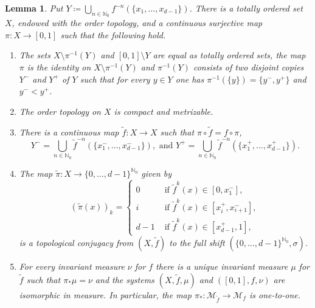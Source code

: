 \documentclass[10pt,a4paper]{amsart}
\numberwithin{equation}{section} %
\numberwithin{figure}{section} %
\newtheorem{lemm}[prop]{Lemma}
\newcommand{\N}{\mathbb{N}}
\renewcommand{\=}{\coloneqq}
\begin{document}
\begin{lemm}\label{extension lemma}
     Put $Y\= \bigcup_{n\in\N_0} f^{-n}(\{x_1,\ldots,x_{d-1}\})$. There is a totally ordered set $X$, endowed with the order topology, and a continuous surjective map $\pi: X\to[0,1]$ such that the following hold.
    \begin{enumerate}
        \item[1.] The sets $X\setminus \pi^{-1}(Y)$ and $[0,1]\setminus Y$ are equal as totally ordered sets, the map $\pi$ is the identity on $X\setminus \pi^{-1}(Y)$ and $\pi^{-1}(Y)$ consists of two disjoint copies $Y^{-}$ and $Y^{+}$ of $Y$ such that for every $y\in Y$ one has $\pi^{-1}(\{y\})=\{y^-,y^+\}$ and $y^-<y^+$.

        \item[2.] The order topology on $X$ is compact and metrizable.

        \item[3.] There is a continuous map $\widetilde{f}: X\to X$ such that $\pi\circ \widetilde{f} = f\circ\pi$,
        \begin{equation*}
            Y^- = \bigcup_{n\in\N_0}\widetilde{f}^{-n}(\{x_1^-,\ldots, x_{d-1}^-\}), \text{ and } Y^+= \bigcup_{n\in\N_0}\widetilde{f}^{-n}(\{x_1^+,\ldots, x_{d-1}^+\}).
        \end{equation*}

    \item[4.] The map $\widetilde{\pi}:X\to \{0,\ldots,d-1\}^{\N_0}$ given by 
\begin{equation*}
    (\widetilde{\pi}(x))_k= \begin{cases}
        0 & \text{ if }\widetilde{f}^k(x) \in [0,x_1^-],\\
        i & \text{ if }\widetilde{f}^k(x) \in [x_i^+,x_{i+1}^-],\\
        d-1 & \text{ if }\widetilde{f}^k(x)\in [x_{d-1}^+,1],
    \end{cases}
\end{equation*}
   is a topological conjugacy from $(X,\widetilde{f})$ to the full shift $(\{0,\ldots,d-1\}^{\N_0},\sigma)$.

    \item[5.] For every invariant measure $\nu$ for $f$ there is a unique invariant measure $\mu$ for $\widetilde{{f}}$ such that $\pi_*\mu=\nu$ and the systems $(X,\widetilde{f},\mu)$ and $([0,1],f,\nu)$ are isomorphic in measure. In particular, the map $\pi_*:\mathcal{M}_{\widetilde{f}}\to \mathcal{M}_f$ is one-to-one.
    \end{enumerate}
\end{lemm}
\end{document}
